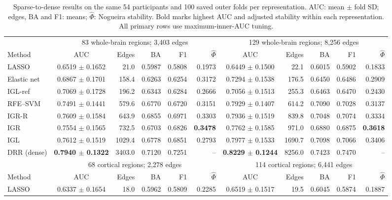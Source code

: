 \begin{table}[t]
\centering
\caption{Sparse-to-dense results on the same 54 participants and 100 saved outer folds per representation. AUC: mean $\pm$ fold SD; edges, BA and F1: means; $\widehat\Phi$: Nogueira stability. Bold marks highest AUC and adjusted stability within each representation. All primary rows use maximum-inner-AUC tuning.}
\label{tab:primary}
\fontsize{9}{10.5}\selectfont
\setlength{\tabcolsep}{2.4pt}
\begin{tabular}{@{}lcrrrrcrrrr@{}}
\toprule
& \multicolumn{5}{c}{83 whole-brain regions; 3,403 edges} & \multicolumn{5}{c}{129 whole-brain regions; 8,256 edges} \\
\cmidrule(lr){2-6}\cmidrule(l){7-11}
Method & AUC & Edges & BA & F1 & $\widehat\Phi$ & AUC & Edges & BA & F1 & $\widehat\Phi$ \\
\midrule
LASSO & 0.6519 $\pm$ 0.1652 & 21.0 & 0.5987 & 0.5808 & 0.1973 & 0.6449 $\pm$ 0.1500 & 22.1 & 0.6015 & 0.5902 & 0.1833 \\
Elastic net & 0.6867 $\pm$ 0.1701 & 158.4 & 0.6263 & 0.6254 & 0.3172 & 0.7294 $\pm$ 0.1538 & 176.5 & 0.6450 & 0.6486 & 0.2909 \\
IGL-ref & 0.7069 $\pm$ 0.1728 & 196.2 & 0.6343 & 0.6284 & 0.2666 & 0.7056 $\pm$ 0.1513 & 255.3 & 0.6463 & 0.6470 & 0.2430 \\
RFE--SVM & 0.7491 $\pm$ 0.1441 & 579.6 & 0.6770 & 0.6720 & 0.3151 & 0.7929 $\pm$ 0.1407 & 614.2 & 0.7090 & 0.7028 & 0.3137 \\
IGR-R & 0.7609 $\pm$ 0.1584 & 643.9 & 0.6855 & 0.6971 & 0.3303 & 0.7936 $\pm$ 0.1519 & 839.8 & 0.7048 & 0.7074 & 0.3334 \\
IGR & 0.7554 $\pm$ 0.1565 & 732.5 & 0.6703 & 0.6826 & \textbf{0.3478} & 0.7762 $\pm$ 0.1585 & 971.0 & 0.6880 & 0.6875 & \textbf{0.3618} \\
IGL & 0.7612 $\pm$ 0.1519 & 1029.4 & 0.6778 & 0.6851 & 0.2793 & 0.7977 $\pm$ 0.1533 & 1690.7 & 0.7098 & 0.7066 & 0.3406 \\
DRR (dense) & \textbf{0.7940 $\pm$ 0.1322} & 3403.0 & 0.7120 & 0.7251 & -- & \textbf{0.8229 $\pm$ 0.1244} & 8256.0 & 0.7423 & 0.7470 & -- \\
\midrule
& \multicolumn{5}{c}{68 cortical regions; 2,278 edges} & \multicolumn{5}{c}{114 cortical regions; 6,441 edges} \\
\cmidrule(lr){2-6}\cmidrule(l){7-11}
Method & AUC & Edges & BA & F1 & $\widehat\Phi$ & AUC & Edges & BA & F1 & $\widehat\Phi$ \\
\midrule
LASSO & 0.6337 $\pm$ 0.1654 & 18.0 & 0.5962 & 0.5809 & 0.2285 & 0.6519 $\pm$ 0.1517 & 19.5 & 0.6045 & 0.5874 & 0.1887 \\

\end{tabular}
\end{table}
